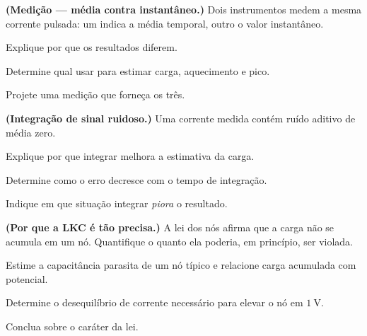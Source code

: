 \begin{questao}[4]{}

\textbf{(Medição --- média contra instantâneo.)} Dois instrumentos medem a
mesma corrente pulsada: um indica a média temporal, outro o valor instantâneo.
\begin{itensq}
\item Explique por que os resultados diferem.
\item Determine qual usar para estimar carga, aquecimento e pico.
\item Projete uma medição que forneça os três.
\end{itensq}


\end{questao}
\begin{questao}[4]{}

\textbf{(Integração de sinal ruidoso.)} Uma corrente medida contém ruído
aditivo de média zero.
\begin{itensq}
\item Explique por que integrar melhora a estimativa da carga.
\item Determine como o erro decresce com o tempo de integração.
\item Indique em que situação integrar \emph{piora} o resultado.
\end{itensq}


\end{questao}
\begin{questao}[4]{}

\textbf{(Por que a LKC é tão precisa.)} A lei dos nós afirma que a carga não se
acumula em um nó. Quantifique o quanto ela poderia, em princípio, ser violada.
\begin{itensq}
\item Estime a capacitância parasita de um nó típico e relacione carga acumulada
      com potencial.
\item Determine o desequilíbrio de corrente necessário para elevar o nó em
      $\SI{1}{\volt}$.
\item Conclua sobre o caráter da lei.
\end{itensq}


\end{questao}
